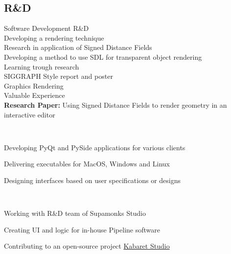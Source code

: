 \documentclass[a4paper]{MagicalCV}
\begin{document}
\begin{minipage}[t]{0.49\textwidth}


\subsection{R\&D}
Software Development R\&D \\
Developing a rendering technique \\
Research in application of Signed Distance Fields \\
Developing a method to use SDL for transparent object rendering \\
Learning trough research \\
SIGGRAPH Style report and poster \\
Graphics Rendering \\
 Valuable Experience \\
\textbf{Research Paper: }
Using Signed Distance Fields to render geometry in an interactive editor
\sectionsep



 \\
\vspace{\topsep} %
\begin{tightemize}
\item Developing PyQt and PySide applications for various clients
\item Delivering executables for MacOS, Windows and Linux
\item Designing interfaces based on user specifications or designs
\end{tightemize}
\sectionsep

 \\
\vspace{\topsep} %
\begin{tightemize}
\item Working with R\&D team of Supamonks Studio
 \item Creating UI and logic for in-house Pipeline software
 \item Contributing to an open-source project \href{https://www.kabaretstudio.com/credits}{Kabaret Studio}
\end{tightemize}
\sectionsep


\end{minipage}
\end{document}
